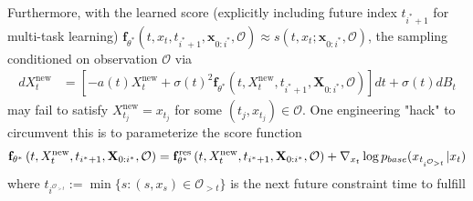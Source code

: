 \documentclass{article}
\newcommand{\pbase}{p_{\normalfont{base}}}
\begin{document}
Furthermore, with the learned score (explicitly including future index $t_{i^*+1}$ for multi-task learning)
    $\mathbf{f}_{\theta^*}(t, x_t, t_{i^* + 1}, \mathbf{x}_{0:i^*}, \mathcal{O}) \approx s(t, x_t; \mathbf{x}_{0:i^*}, \mathcal{O})$,
the sampling conditioned on observation $\mathcal{O}$ via
\begin{align}
    dX^{\text{new}}_t &= \left[-a(t)X^{\text{new}}_t + \sigma(t)^2 \mathbf{f}_{\theta^*}\left(t, X^{\text{new}}_t, t_{i^* + 1}, \mathbf{X}_{0:i^*}, \mathcal{O}\right)\right]dt + \sigma(t)dB_t
\end{align}
may fail to satisfy $X^{\text{new}}_{t_j} = x_{t_j}$ for some $(t_j, x_{t_j}) \in \mathcal{O}$.
One engineering "hack" to circumvent this is to parameterize the score function
\begin{align}
    \mathbf{f}_{\theta^*}\left(t, X^{\text{new}}_t, t_{i^* + 1}, \mathbf{X}_{0:i^*}, \mathcal{O}\right) = \mathbf{f}_{\theta^*}^\text{res}\left(t, X^{\text{new}}_t, t_{i^* + 1}, \mathbf{X}_{0:i^*}, \mathcal{O}\right) + \nabla_{x_t} \log \pbase(x_{t_{i^{\mathcal{O}_{>t}}}}\vert x_t) \label{eqn:residual_bb}
\end{align}
where $t_{i^{\mathcal{O}_{>t}}} := \min \{s: (s,x_s)\in \mathcal{O}_{>t}\}$ is the next future constraint time to fulfill
\end{document}

